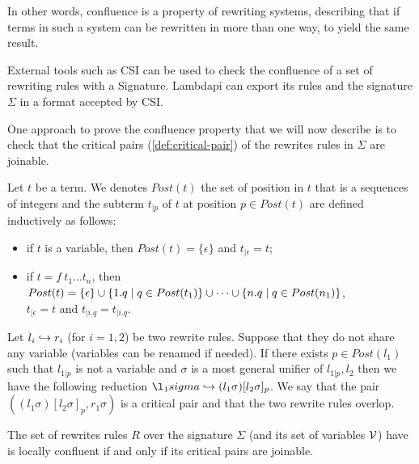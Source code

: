 In other words, confluence is a property of rewriting systems, describing that if terms in such a system can be rewritten in more than one way, to yield the same result. 

\begin{remark}
External tools such as CSI \cite{CSI} can be used to check the confluence of a set of rewriting rules with a Signature.
Lambdapi can export its rules and the signature $\Sigma$ in a format accepted by CSI. 
\end{remark}

One approach to prove the confluence property that we will now describe is to check that the critical pairs (\cref{def:critical-pair}) of the rewrites rules in $\Sigma$ are joinable.

\begin{definition}
Let $t$ be a term. We denotes $Post(t)$ the set of position in $t$ that is a sequences of integers and the subterm $t_{| p}$ of $t$
at position $p \in Post(t)$ are defined inductively as follows:
\begin{itemize}
  \item if $t$ is a variable, then $Post(t) = \{ \epsilon \}$ and $t_{| \epsilon} = t$;
  \item if $t = f~t_1 \dots t_n$, then \( Post(t) = \{ \epsilon \} \cup \{1.q \pipe q \in Post(t_1)\} \cup \dots \cup \{n.q \pipe q \in Post(n_1)\} \),
    \( t_{| \epsilon} = t \text{ and } t_{| i.q} = t_{| i.q} \).
  
\end{itemize}
\end{definition}

\begin{definition}\label{def:critical-pair}
Let $l_i \re r_i$ (for $i = 1, 2$) be two rewrite rules. Suppose that they do not share any variable (variables can be renamed if needed).
If there exists $p \in Post(l_1)$ such that $l_{1 | p}$ is not a variable and $\sigma$ is a most general unifier of $l_{1 | p}, l_2$ then
we have the following reduction $\l_1sigma \re (l_1\sigma)[l_2\sigma]_p$. We say that the pair $((l_1\sigma)[l_2\sigma]_p, r_1\sigma)$ is a
critical pair and that the two rewrite rules overlop.
\end{definition}

\begin{theorem}\label{thm:cp}
The set of rewrites rules $R$ over the signature $\Sigma$ (and its set of variables $\cal{V}$) have  is locally confluent if and only if its critical pairs are joinable.
\end{theorem}


